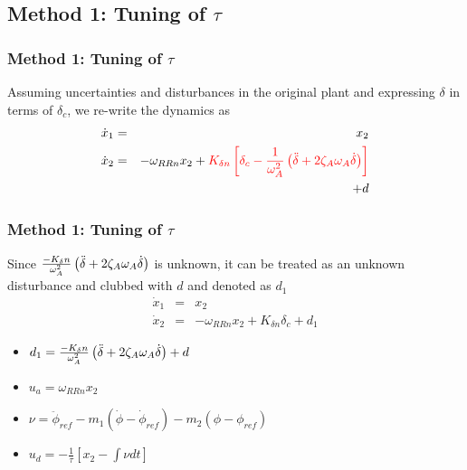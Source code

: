 \documentclass[table,10pt,red]{beamer}	%
\begin{document}
\subsection{Method 1: Tuning of $\tau$}
\begin{frame}
\frametitle{Method 1: Tuning of $\tau$}
Assuming uncertainties and disturbances in the original plant and expressing $\delta$ in terms of $\delta_c$,  we re-write the dynamics as
%
\begin{eqnarray*}
\dot{x}_1 &=& x_2 \nonumber \\
\dot{x}_2 &=& - \omega_{RRn}x_2 + {\color{red}{K_{\delta n}\left[\delta_c - {{1}\over{\omega^2_A}}\left( \ddot \delta + 2\zeta_A \omega_A \dot \delta\right)\right]}} \nonumber \\
&& + d
\label{eq19}
\end{eqnarray*}
\end{frame}
\begin{frame}
\frametitle{Method 1: Tuning of $\tau$}
Since ${{-K_\delta n}\over{\omega^2_A}}\left( \ddot \delta + 2\zeta_A \omega_A \dot \delta\right)$ is unknown, it can be treated as an unknown disturbance and clubbed with $d$ and denoted as $d_1$
\begin{eqnarray*}
\dot{x}_1 &=& x_2 \nonumber \\
\dot{x}_2 &=& - \omega_{RRn}x_2 + K_{\delta n}\delta_c + d_1
\label{eq20}
\end{eqnarray*}
%
\begin{itemize}  %
		\item $d_1 = {{-K_\delta n}\over{\omega^2_A}}\left( \ddot \delta + 2\zeta_A \omega_A \dot \delta\right) + d$
		\item $u_a =  \omega_{RRn
		}x_2$
		\item  $\nu = \ddot{\phi}_{ref} - m_1(\dot{\phi} - \dot{\phi}_{ref}) - m_2(\phi - \phi_{ref})$
		\item $u_d= - \frac{1}{\tau}\left[x_2 - \int \nu dt\right]$
				
\end{itemize}
\end{frame}
\end{document}
